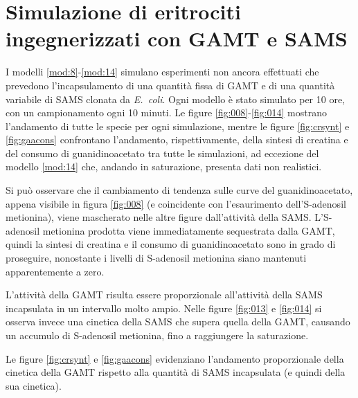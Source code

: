 \section{Simulazione di eritrociti ingegnerizzati con GAMT e SAMS}\label{sez:simpred}
	I modelli \ref{mod:8}-\ref{mod:14} simulano esperimenti non ancora effettuati che prevedono l'incapsulamento di una quantit\`a fissa di GAMT e di una quantit\`a variabile di SAMS clonata da \emph{E.\ coli}.
	Ogni modello \`e stato simulato per 10 ore, con un campionamento ogni 10 minuti.
	Le figure \ref{fig:008}-\ref{fig:014} mostrano l'andamento di tutte le specie per ogni simulazione, mentre le figure \ref{fig:crsynt} e \ref{fig:gaacons} confrontano l'andamento, rispettivamente, della sintesi di creatina e del consumo di guanidinoacetato tra tutte le simulazioni, ad eccezione del modello \ref{mod:14} che, andando in saturazione, presenta dati non realistici.
	
	Si pu\`o osservare che il cambiamento di tendenza sulle curve del guanidinoacetato, appena visibile in figura \ref{fig:008} (e coincidente con l'esaurimento dell'S-adenosil metionina), viene mascherato nelle altre figure dall'attivit\`a della SAMS.
	L'S-adenosil metionina prodotta viene immediatamente sequestrata dalla GAMT, quindi la sintesi di creatina e il consumo di guanidinoacetato sono in grado di proseguire, nonostante i livelli di S-adenosil metionina siano mantenuti apparentemente a zero.
	
	L'attivit\`a della GAMT risulta essere proporzionale all'attivit\`a della SAMS incapsulata in un intervallo molto ampio.
	Nelle figure \ref{fig:013} e \ref{fig:014} si osserva invece una cinetica della SAMS che supera quella della GAMT, causando un accumulo di S-adenosil metionina, fino a raggiungere la saturazione.
	
	Le figure \ref{fig:crsynt} e \ref{fig:gaacons} evidenziano l'andamento proporzionale della cinetica della GAMT rispetto alla quantit\`a di SAMS incapsulata (e quindi della sua cinetica).

